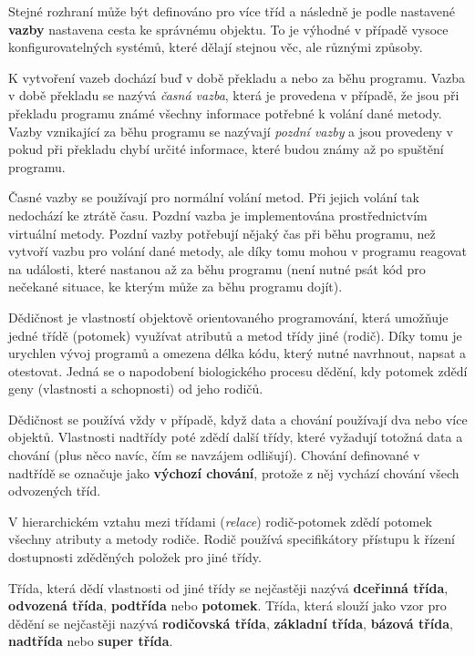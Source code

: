 
Stejné rozhraní může být definováno pro více tříd a následně je podle nastavené {\bf vazby} nastavena cesta ke správnému objektu. To je výhodné v případě vysoce konfigurovatelných systémů, které dělají stejnou věc, ale různými způsoby.

K vytvoření vazeb dochází buď v době překladu a nebo za běhu programu. Vazba v době překladu se nazývá {\it časná vazba}, která je provedena v případě, že jsou při překladu programu známé všechny informace potřebné k volání dané metody. Vazby vznikající za běhu programu se nazývají {\it pozdní vazby} a jsou provedeny v pokud při překladu chybí určité informace, které budou známy až po spuštění programu.

Časné vazby se používají pro normální volání metod. Při jejich volání tak nedochází ke ztrátě času. Pozdní vazba je implementována prostřednictvím virtuální metody. Pozdní vazby potřebují nějaký čas při běhu programu, než vytvoří vazbu pro volání dané metody, ale díky tomu mohou v programu reagovat na události, které nastanou až za běhu programu (není nutné psát kód pro nečekané situace, ke kterým může za běhu programu dojít).


Dědičnost je vlastností objektově orientovaného programování, která umožňuje jedné třídě (potomek) využívat atributů a metod třídy jiné (rodič). Díky tomu je urychlen vývoj programů a omezena délka kódu, který nutné navrhnout, napsat a otestovat. Jedná se o napodobení biologického procesu dědění, kdy potomek zdědí geny (vlastnosti a schopnosti) od jeho rodičů.

Dědičnost se používá vždy v případě, když data a chování používají dva nebo více objektů. Vlastnosti nadtřídy poté zdědí další třídy, které vyžadují totožná data a chování (plus něco navíc, čím se navzájem odlišují). Chování definované v nadtřídě se označuje jako {\bf výchozí chování}, protože z něj vychází chování všech odvozených tříd.


V hierarchickém vztahu mezi třídami ({\it relace}) rodič-potomek zdědí potomek všechny atributy a metody rodiče. Rodič používá specifikátory přístupu k řízení dostupnosti zděděných položek pro jiné třídy.

Třída, která dědí vlastnosti od jiné třídy se nejčastěji nazývá {\bf dceřinná třída}, {\bf odvozená třída}, {\bf podtřída} nebo {\bf potomek}. Třída, která slouží jako vzor pro dědění se nejčastěji nazývá {\bf rodičovská třída}, {\bf základní třída}, {\bf bázová třída}, {\bf nadtřída} nebo {\bf super třída}.

